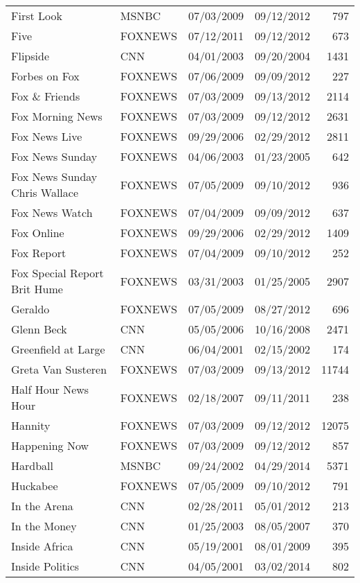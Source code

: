 {\begin{longtable}{llllr}
  First Look & MSNBC & 07/03/2009 & 09/12/2012 & 797 \\ 
  Five & FOXNEWS & 07/12/2011 & 09/12/2012 & 673 \\ 
  Flipside & CNN & 04/01/2003 & 09/20/2004 & 1431 \\ 
  Forbes on Fox & FOXNEWS & 07/06/2009 & 09/09/2012 & 227 \\ 
  Fox \& Friends & FOXNEWS & 07/03/2009 & 09/13/2012 & 2114 \\ 
  Fox Morning News & FOXNEWS & 07/03/2009 & 09/12/2012 & 2631 \\ 
  Fox News Live & FOXNEWS & 09/29/2006 & 02/29/2012 & 2811 \\ 
  Fox News Sunday & FOXNEWS & 04/06/2003 & 01/23/2005 & 642 \\ 
  Fox News Sunday Chris Wallace & FOXNEWS & 07/05/2009 & 09/10/2012 & 936 \\ 
  Fox News Watch & FOXNEWS & 07/04/2009 & 09/09/2012 & 637 \\ 
  Fox Online & FOXNEWS & 09/29/2006 & 02/29/2012 & 1409 \\ 
  Fox Report & FOXNEWS & 07/04/2009 & 09/10/2012 & 252 \\ 
  Fox Special Report Brit Hume & FOXNEWS & 03/31/2003 & 01/25/2005 & 2907 \\ 
  Geraldo & FOXNEWS & 07/05/2009 & 08/27/2012 & 696 \\ 
  Glenn Beck & CNN & 05/05/2006 & 10/16/2008 & 2471 \\ 
  Greenfield at Large & CNN & 06/04/2001 & 02/15/2002 & 174 \\ 
  Greta Van Susteren & FOXNEWS & 07/03/2009 & 09/13/2012 & 11744 \\ 
  Half Hour News Hour & FOXNEWS & 02/18/2007 & 09/11/2011 & 238 \\ 
  Hannity & FOXNEWS & 07/03/2009 & 09/12/2012 & 12075 \\ 
  Happening Now & FOXNEWS & 07/03/2009 & 09/12/2012 & 857 \\ 
  Hardball & MSNBC & 09/24/2002 & 04/29/2014 & 5371 \\ 
  Huckabee & FOXNEWS & 07/05/2009 & 09/10/2012 & 791 \\ 
  In the Arena & CNN & 02/28/2011 & 05/01/2012 & 213 \\ 
  In the Money & CNN & 01/25/2003 & 08/05/2007 & 370 \\ 
  Inside Africa & CNN & 05/19/2001 & 08/01/2009 & 395 \\ 
  Inside Politics & CNN & 04/05/2001 & 03/02/2014 & 802 \\ 

\end{longtable}}
